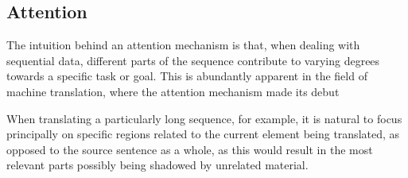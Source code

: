 \documentclass[../../fyp.tex]{subfiles}
\begin{document}




\subsection{Attention}
The intuition behind an attention mechanism is that, when dealing with sequential data, different parts of the sequence contribute to varying degrees towards a specific task or goal. This is abundantly apparent in the field of machine translation, where the attention mechanism made its debut \cite{bahdanau2014}

When translating a particularly long sequence, for example, it is natural to focus principally on specific regions related to the current element being translated, as opposed to the source sentence as a whole, as this would result in the most relevant parts possibly being shadowed by unrelated material.
\end{document}
